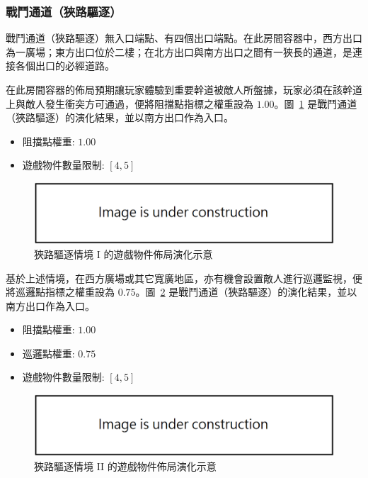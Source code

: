 \subsubsection{戰鬥通道（狹路驅逐）}
\label{sssec:method-segments-appliedonvolumes-battlepath-narrow}

戰鬥通道（狹路驅逐）無入口端點、有四個出口端點。在此房間容器中，西方出口為一廣場；東方出口位於二樓；在北方出口與南方出口之間有一狹長的通道，是連接各個出口的必經道路。

在此房間容器的佈局預期讓玩家體驗到重要幹道被敵人所盤據，玩家必須在該幹道上與敵人發生衝突方可通過，便將阻擋點指標之權重設為 $1.00$。圖~\ref{fig:applied-ga-on-volume-battlepath-narrow-i} 是戰鬥通道（狹路驅逐）的演化結果，並以南方出口作為入口。

\begin{itemize}
  \setlength\itemsep{-0.5em}
  \item 阻擋點權重: $1.00$
  \item 遊戲物件數量限制: $[4, 5]$
\end{itemize}

\begin{figure}[H]
  \begin{center}
    \includegraphics[width=1.0\textwidth]{figures/under_construction.png}
    \caption{狹路驅逐情境 I 的遊戲物件佈局演化示意} 
    \label{fig:applied-ga-on-volume-battlepath-narrow-i}
  \end{center}
\end{figure}

基於上述情境，在西方廣場或其它寬廣地區，亦有機會設置敵人進行巡邏監視，便將巡邏點指標之權重設為 $0.75$。圖~\ref{fig:applied-ga-on-volume-battlepath-narrow-ii} 是戰鬥通道（狹路驅逐）的演化結果，並以南方出口作為入口。

\begin{itemize}
  \setlength\itemsep{-0.5em}
  \item 阻擋點權重: $1.00$
  \item 巡邏點權重: $0.75$
  \item 遊戲物件數量限制: $[4, 5]$
\end{itemize}

\begin{figure}[H]
  \begin{center}
    \includegraphics[width=1.0\textwidth]{figures/under_construction.png}
    \caption{狹路驅逐情境 II 的遊戲物件佈局演化示意} 
    \label{fig:applied-ga-on-volume-battlepath-narrow-ii}
  \end{center}
\end{figure}

